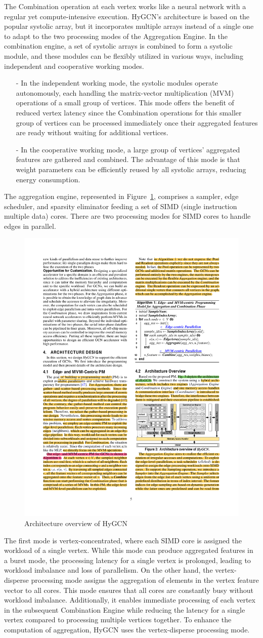 The Combination operation at each vertex works like a neural network with a regular yet compute-intensive execution.
HyGCN's architecture is based on the popular systolic array, but it incorporates multiple arrays instead of a single one to adapt to the two processing modes of the Aggregation Engine.
In the combination engine, a set of systolic arrays is combined to form a systolic module, and these modules can be flexibly utilized in various ways, including independent and cooperative working modes.

\begin{itemize}
    \item[-] In the independent working mode, the systolic modules operate autonomously, each handling the matrix-vector multiplication (MVM) operations of a small group of vertices.
          This mode offers the benefit of reduced vertex latency since the Combination operations for this smaller group of vertices can be processed immediately once their aggregated features are ready without waiting for additional vertices.
    \item[-] In the cooperative working mode, a large group of vertices' aggregated features are gathered and combined.
          The advantage of this mode is that weight parameters can be efficiently reused by all systolic arrays, reducing energy consumption.
\end{itemize}

The aggregation engine, represented in Figure~\ref{fig:hygcn_architecture}, comprises a sampler, edge scheduler, and sparsity eliminator feeding a set of SIMD (single instruction multiple data) cores.
There are two processing modes for SIMD cores to handle edges in parallel.

\begin{figure}[t]
    \centering
    \includegraphics[height=0.3\textwidth]{Images/HyGCN_architecture}
    \caption{Architecture overview of HyGCN~\cite{DBLP:journals/corr/abs-2001-02514}}
    \label{fig:hygcn_architecture}
\end{figure}

The first mode is vertex-concentrated, where each SIMD core is assigned the workload of a single vertex.
While this mode can produce aggregated features in a burst mode, the processing latency for a single vertex is prolonged, leading to workload imbalance and loss of parallelism.
On the other hand, the vertex-disperse processing mode assigns the aggregation of elements in the vertex feature vector to all cores.
This mode ensures that all cores are constantly busy without workload imbalance.
Additionally, it enables immediate processing of each vertex in the subsequent Combination Engine while reducing the latency for a single vertex compared to processing multiple vertices together.
To enhance the computation of aggregation, HyGCN uses the vertex-disperse processing mode.

